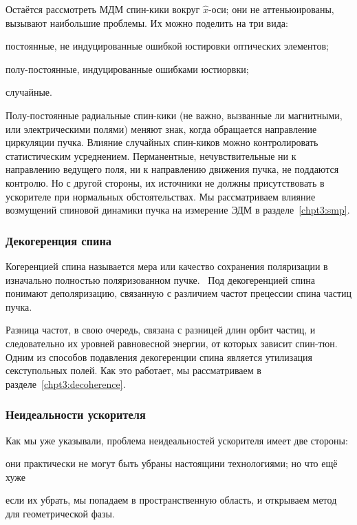 Остаётся рассмотреть МДМ спин-кики вокруг $\hat x$-оси; они не аттеньюированы, вызывают наибольшие проблемы.
Их можно поделить на три вида: 
\begin{enumerate*}
	\item постоянные, не индуцированные ошибкой юстировки оптических элементов;
	\item полу-постоянные, индуцированные ошибками юстиорвки;
	\item случайные.
\end{enumerate*}

Полу-постоянные радиальные спин-кики (не важно, вызванные ли магнитными, или электрическими полями) меняют
знак, когда обращается направление циркуляции пучка. Влияние случайных спин-киков можно контролировать 
статистическим усреднением. Перманентные, нечувствительные ни к направлению ведущего поля, ни к направлению
движения пучка, не поддаются контролю. Но с другой стороны, их источники не должны присутствовать в ускорителе
при нормальных обстоятельствах. Мы рассматриваем влияние возмущений спиновой динамики пучка на измерение
ЭДМ в разделе~\ref{chpt3:smp}.

\subsubsection{Декогеренция спина}
Когеренцией спина называется мера или качество сохранения поляризации
в изначально полностью поляризованном пучке.~\cite[стр.~205]{Eremey:Thesis}
Под декогеренцией спина понимают деполяризацию, связанную с различием частот прецессии спина
частиц пучка. 

Разница частот, в свою очередь, связана с разницей длин орбит частиц, и следовательно
их уровней равновесной энергии, от которых зависит спин-тюн. Одним из способов подавления декогеренции
спина является утилизация секступольных полей. Как это работает, мы рассматриваем в разделе~\ref{chpt3:decoherence}.

\subsubsection{Неидеальности ускорителя}
Как мы уже указывали, проблема неидеальностей ускорителя имеет две стороны:
\begin{enumerate*}
	\item они практически не могут быть убраны настоящини технологиями; но что ещё хуже
	\item если их убрать, мы попадаем в пространственную область, и открываем метод для геометрической фазы.
\end{enumerate*}

